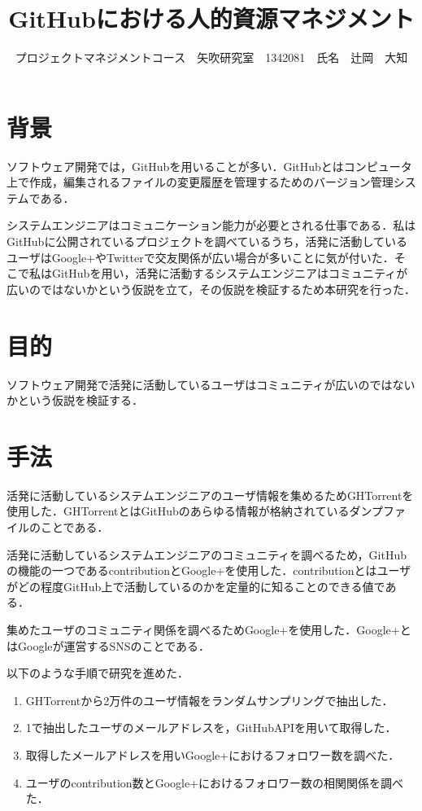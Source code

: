 \documentclass[uplatex,twocolumn,dvipdfmx]{jsarticle}
\title{\vspace{-5mm}\fontsize{14pt}{0pt}\selectfont GitHubにおける人的資源マネジメント}
\author{\normalsize プロジェクトマネジメントコース　矢吹研究室　1342081　氏名　辻岡　大知}
\date{}
\begin{document}
\fontsize{10.5pt}{\baselineskip}\selectfont
\maketitle





\section{背景}

ソフトウェア開発では，GitHubを用いることが多い．GitHubとはコンピュータ上で作成，編集されるファイルの変更履歴を管理するためのバージョン管理システムである．\cite{a}


システムエンジニアはコミュニケーション能力が必要とされる仕事である．私はGitHubに公開されているプロジェクトを調べているうち，活発に活動しているユーザはGoogle+やTwitterで交友関係が広い場合が多いことに気が付いた．そこで私はGitHubを用い，活発に活動するシステムエンジニアはコミュニティが広いのではないかという仮説を立て，その仮説を検証するため本研究を行った．


\section{目的}

ソフトウェア開発で活発に活動しているユーザはコミュニティが広いのではないかという仮説を検証する．

\section{手法}

活発に活動しているシステムエンジニアのユーザ情報を集めるためGHTorrentを使用した．GHTorrentとはGitHubのあらゆる情報が格納されているダンプファイルのことである．

活発に活動しているシステムエンジニアのコミュニティを調べるため，GitHubの機能の一つであるcontributionとGoogle+を使用した．contributionとはユーザがどの程度GitHub上で活動しているのかを定量的に知ることのできる値である．

集めたユーザのコミュニティ関係を調べるためGoogle+を使用した．Google+とはGoogleが運営するSNSのことである．

以下のような手順で研究を進めた．

\begin{enumerate}
 \item GHTorrentから2万件のユーザ情報をランダムサンプリングで抽出した．
 \item 1で抽出したユーザのメールアドレスを，GitHubAPIを用いて取得した．
 \item 取得したメールアドレスを用いGoogle+におけるフォロワー数を調べた．
 \item ユーザのcontribution数とGoogle+におけるフォロワー数の相関関係を調べた．
\end{enumerate}
\end{document}
